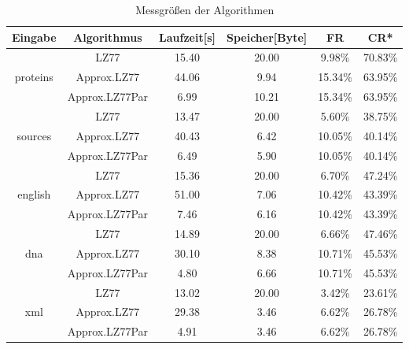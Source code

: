 \begin{table}[ht]
    \centering
    \caption{Messgrößen der Algorithmen}
    \label{messwerte}
    \begin{tabular} { |c|c|c|c|c|c| }
        \hline
        \textbf{Eingabe} & \textbf{Algorithmus} & \textbf{Laufzeit[s]} & \textbf{Speicher[Byte]} & \textbf{FR} & \textbf{CR*} \\
        \hline
        & LZ77 & 15.40 & 20.00 & 9.98\% & 70.83\% \\
        proteins & Approx.LZ77 & 44.06 & 9.94 & 15.34\% & 63.95\% \\
        & Approx.LZ77Par & 6.99 & 10.21 & 15.34\% & 63.95\% \\
        \hline
        & LZ77 & 13.47 & 20.00 & 5.60\% & 38.75\% \\
        sources & Approx.LZ77 & 40.43 & 6.42 & 10.05\% & 40.14\% \\
        & Approx.LZ77Par & 6.49 & 5.90 & 10.05\% & 40.14\% \\
        \hline
        & LZ77 & 15.36 & 20.00 & 6.70\% & 47.24\% \\
        english & Approx.LZ77 & 51.00 & 7.06 & 10.42\% & 43.39\% \\
        & Approx.LZ77Par & 7.46 & 6.16 & 10.42\% & 43.39\% \\
        \hline
        & LZ77 & 14.89 & 20.00 & 6.66\% & 47.46\% \\
        dna & Approx.LZ77 & 30.10 & 8.38 & 10.71\% & 45.53\% \\
        & Approx.LZ77Par & 4.80 & 6.66 & 10.71\% & 45.53\% \\
        \hline
        & LZ77 & 13.02 & 20.00 & 3.42\% & 23.61\% \\
        xml & Approx.LZ77 & 29.38 & 3.46 & 6.62\% & 26.78\% \\
        & Approx.LZ77Par & 4.91 & 3.46 & 6.62\% & 26.78\% \\
        \hline
    \end{tabular}
\end{table}

